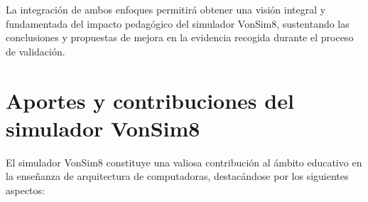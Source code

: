 \documentclass[12pt,oneside]{templates/unerthesis}
\begin{document}
La integración de ambos enfoques permitirá obtener una visión integral y fundamentada del impacto pedagógico del simulador VonSim8, sustentando las conclusiones y propuestas de mejora en la evidencia recogida durante el proceso de validación.

\hypertarget{aportes-y-contribuciones-del-simulador-vonsim8}{%
\section{Aportes y contribuciones del simulador VonSim8}\label{aportes-y-contribuciones-del-simulador-vonsim8}}

El simulador VonSim8 constituye una valiosa contribución al ámbito educativo en la enseñanza de arquitectura de computadoras, destacándose por los siguientes aspectos:
\end{document}
